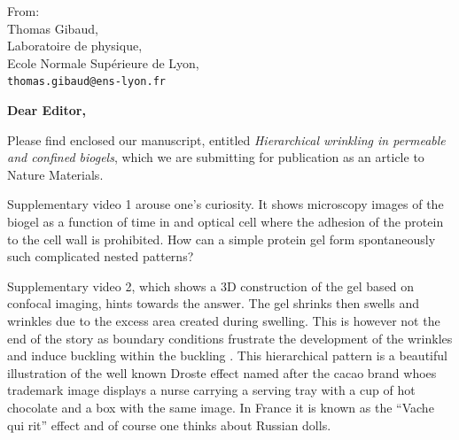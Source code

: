 \documentclass[a4paper, parskip=true, firsthead=false, fromemail=true, foldmarks=false]{scrlttr2}
\begin{document}
\begin{letter}{From:\\
Thomas Gibaud,\\
Laboratoire de physique,\\
Ecole Normale Supérieure de Lyon,\\
\texttt{thomas.gibaud@ens-lyon.fr}
}
\opening{\bf Dear Editor,}

Please find enclosed our manuscript, entitled \emph{Hierarchical wrinkling in permeable and confined biogels}, which we are submitting for publication as an article to Nature Materials.



Supplementary video 1 arouse one's curiosity. It shows microscopy images of the biogel as a function of time in and optical cell where the adhesion of the protein to the cell wall is prohibited. How can a simple protein gel form spontaneously such complicated nested patterns?

Supplementary video 2, which shows a 3D construction of the gel based on confocal imaging, hints towards the answer. The gel shrinks then swells and wrinkles due to the excess area created during swelling. This is however not the end of the story as boundary conditions frustrate the development of the wrinkles and induce buckling within the buckling . This hierarchical pattern is a beautiful illustration of the well known Droste effect named after the cacao brand whoes trademark image displays a nurse carrying a serving tray with a cup of hot chocolate and a box with the same image. In France it is known as the    ``Vache qui rit'' effect and of course one thinks about Russian dolls.



\end{letter}
\end{document}
